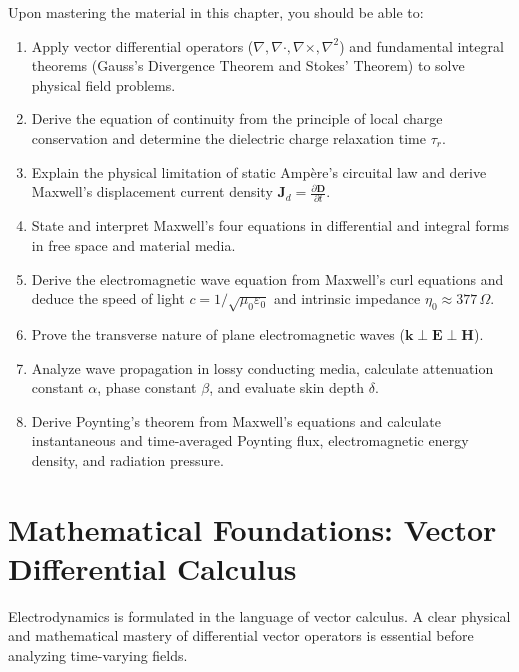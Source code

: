\begin{important}
Upon mastering the material in this chapter, you should be able to:
\begin{enumerate}
    \item Apply vector differential operators ($\nabla, \nabla \cdot, \nabla \times, \nabla^2$) and fundamental integral theorems (Gauss's Divergence Theorem and Stokes' Theorem) to solve physical field problems.
    \item Derive the equation of continuity from the principle of local charge conservation and determine the dielectric charge relaxation time $\tau_r$.
    \item Explain the physical limitation of static Ampère's circuital law and derive Maxwell's displacement current density $\mathbf{J}_d = \frac{\partial \mathbf{D}}{\partial t}$.
    \item State and interpret Maxwell's four equations in differential and integral forms in free space and material media.
    \item Derive the electromagnetic wave equation from Maxwell's curl equations and deduce the speed of light $c = 1/\sqrt{\mu_0 \varepsilon_0}$ and intrinsic impedance $\eta_0 \approx 377\,\Omega$.
    \item Prove the transverse nature of plane electromagnetic waves ($\mathbf{k} \perp \mathbf{E} \perp \mathbf{H}$).
    \item Analyze wave propagation in lossy conducting media, calculate attenuation constant $\alpha$, phase constant $\beta$, and evaluate skin depth $\delta$.
    \item Derive Poynting's theorem from Maxwell's equations and calculate instantaneous and time-averaged Poynting flux, electromagnetic energy density, and radiation pressure.
\end{enumerate}
\end{important}

\section{Mathematical Foundations: Vector Differential Calculus}
Electrodynamics is formulated in the language of vector calculus. A clear physical and mathematical mastery of differential vector operators is essential before analyzing time-varying fields.


